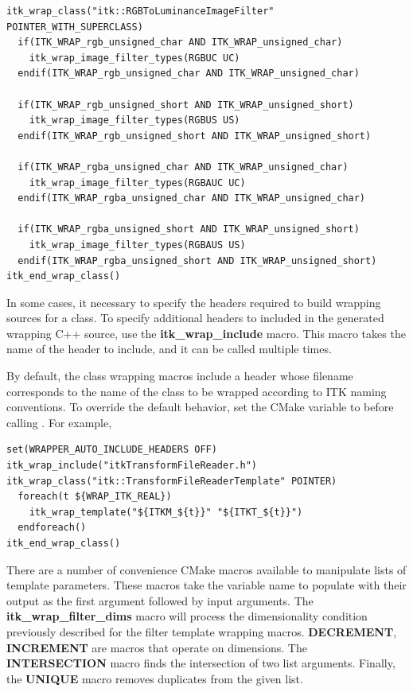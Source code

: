 \begin{verbatim}
itk_wrap_class("itk::RGBToLuminanceImageFilter" POINTER_WITH_SUPERCLASS)
  if(ITK_WRAP_rgb_unsigned_char AND ITK_WRAP_unsigned_char)
    itk_wrap_image_filter_types(RGBUC UC)
  endif(ITK_WRAP_rgb_unsigned_char AND ITK_WRAP_unsigned_char)

  if(ITK_WRAP_rgb_unsigned_short AND ITK_WRAP_unsigned_short)
    itk_wrap_image_filter_types(RGBUS US)
  endif(ITK_WRAP_rgb_unsigned_short AND ITK_WRAP_unsigned_short)

  if(ITK_WRAP_rgba_unsigned_char AND ITK_WRAP_unsigned_char)
    itk_wrap_image_filter_types(RGBAUC UC)
  endif(ITK_WRAP_rgba_unsigned_char AND ITK_WRAP_unsigned_char)

  if(ITK_WRAP_rgba_unsigned_short AND ITK_WRAP_unsigned_short)
    itk_wrap_image_filter_types(RGBAUS US)
  endif(ITK_WRAP_rgba_unsigned_short AND ITK_WRAP_unsigned_short)
itk_end_wrap_class()
\end{verbatim}

In some cases, it necessary to specify the headers required to build wrapping
sources for a class. To specify additional headers to included in the generated
wrapping C++ source, use the \textbf{itk\_wrap\_include} macro. This macro takes the
name of the header to include, and it can be called multiple times.

By default, the class wrapping macros include a header whose filename
corresponds to the name of the class to be wrapped according to ITK naming
conventions. To override the default behavior, set the CMake variable
 to  before calling
. For example,

\begin{verbatim}
set(WRAPPER_AUTO_INCLUDE_HEADERS OFF)
itk_wrap_include("itkTransformFileReader.h")
itk_wrap_class("itk::TransformFileReaderTemplate" POINTER)
  foreach(t ${WRAP_ITK_REAL})
    itk_wrap_template("${ITKM_${t}}" "${ITKT_${t}}")
  endforeach()
itk_end_wrap_class()
\end{verbatim}

There are a number of convenience CMake macros available to manipulate lists
of template parameters. These macros take the variable name to populate with
their output as the first argument followed by input arguments. The
\textbf{itk\_wrap\_filter\_dims} macro will process the dimensionality
condition previously described for the filter template wrapping macros.
\textbf{DECREMENT}, \textbf{INCREMENT} are macros that operate on dimensions.
The \textbf{INTERSECTION} macro finds the intersection of two list arguments.
Finally, the \textbf{UNIQUE} macro removes duplicates from the given list.


